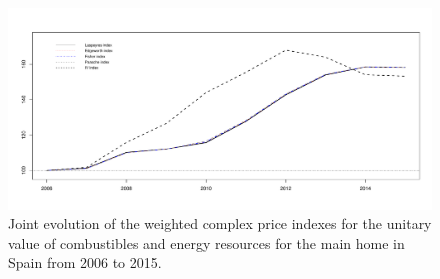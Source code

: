 \begin{figure}[htbp]
	\centering
	\hspace*{-0.7 cm}\includegraphics[scale=0.415]{2.pdf}
	\vspace*{-1 cm}\caption{Joint evolution of the weighted complex price indexes for the unitary value of combustibles and energy resources for the main home in Spain from 2006 to 2015.}
	\label{wjointevolution}
\end{figure}\vspace{-0.15 cm}


